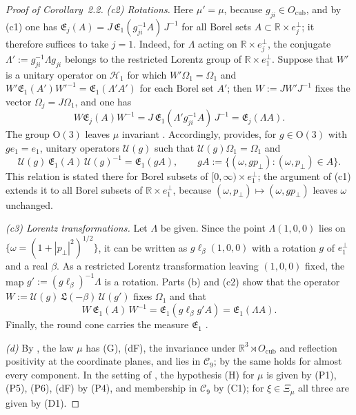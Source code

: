 \documentclass[11pt]{amsart}
\theoremstyle{definition}
\begin{document}
\begin{proof}[Proof of Corollary~2.2]
\emph{(c2) Rotations.}
Here $\mu'=\mu$, because $g_{ji}\in O_{\mathrm{cub}}$, and by (c1) one has $\mathfrak E_j(A)=J\,\mathfrak E_1(g_{ji}^{-1}A)\,J^{-1}$ for all Borel sets $A\subset\mathbb R\times e_j^\perp$; it therefore suffices to take $j=1$.
Indeed, for $\Lambda$ acting on $\mathbb R\times e_j^\perp$, the conjugate $\Lambda':=g_{ji}^{-1}\Lambda g_{ji}$ belongs to the restricted Lorentz group of $\mathbb R\times e_1^\perp$.
Suppose that $W'$ is a unitary operator on $\mathcal H_1$ for which $W'\Omega_1=\Omega_1$ and $W'\mathfrak E_1(A')W'^{-1}=\mathfrak E_1(\Lambda'A')$ for each Borel set $A'$; then $W:=JW'J^{-1}$ fixes the vector $\Omega_j=J\Omega_1$, and one has
\begin{equation*}
W\mathfrak E_j(A)W^{-1}=J\,\mathfrak E_1(\Lambda'g_{ji}^{-1}A)\,J^{-1}=\mathfrak E_j(\Lambda A).
\end{equation*}
The group $\mathrm O(3)$ leaves $\mu$ invariant \cite[Theorem~1.4, Part~I\,(a), (f)]{QEDII}.
Accordingly, \cite[Proposition~14.47\,(a)]{QEDII} provides, for $g\in\mathrm O(3)$ with $ge_1=e_1$, unitary operators $\mathcal U(g)$ such that $\mathcal U(g)\Omega_1=\Omega_1$ and
\begin{equation*}
\mathcal U(g)\,\mathfrak E_1(A)\,\mathcal U(g)^{-1}=\mathfrak E_1(gA),\qquad gA:=\{(\omega,gp_\perp):(\omega,p_\perp)\in A\}.
\end{equation*}
This relation is stated there for Borel subsets of $[0,\infty)\times e_1^\perp$; the argument of (c1) extends it to all Borel subsets of $\mathbb R\times e_1^\perp$, because $(\omega,p_\perp)\mapsto(\omega,gp_\perp)$ leaves $\omega$ unchanged.

\emph{(c3) Lorentz transformations.}
Let $\Lambda$ be given.
Since the point $\Lambda(1,0,0)$ lies on $\{\omega=(1+|p_\perp|^2)^{1/2}\}$, it can be written as $g\ell_\beta(1,0,0)$ with a rotation $g$ of $e_1^\perp$ and a real $\beta$.
As a restricted Lorentz transformation leaving $(1,0,0)$ fixed, the map $g':=(g\ell_\beta)^{-1}\Lambda$ is a rotation.
Parts (b) and (c2) show that the operator $W:=\mathcal U(g)\,\mathfrak L(-\beta)\,\mathcal U(g')$ fixes $\Omega_1$ and that
\begin{equation*}
W\,\mathfrak E_1(A)\,W^{-1}=\mathfrak E_1(g\ell_\beta g'A)=\mathfrak E_1(\Lambda A).
\end{equation*}
Finally, the round cone carries the measure $\mathfrak E_1$ \cite[Theorem~1.4, Part~I\,(c), (f)]{QEDII}.

\emph{(d)} By \cite[Theorem~1.3\,(a), (b)(i)]{QEDII}, the law $\mu$ has (G), (dF), the invariance under $\mathbb R^3\rtimes O_{\mathrm{cub}}$ and reflection positivity at the coordinate planes, and lies in $\mathcal C_9$; by \cite[Theorem~1.3\,(b)(v)]{QEDII} the same holds for almost every component.
In the setting of \cite[Theorem~44]{QEDIII}, the hypothesis (H) for $\mu$ is given by (P1), (P5), (P6), (dF) by (P4), and membership in $\mathcal C_9$ by (C1); for $\xi\in\Xi_\mu$ all three are given by (D1).
\end{proof}
\end{document}
